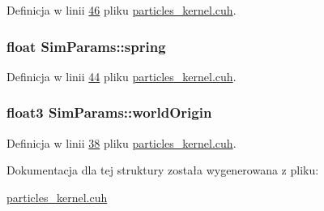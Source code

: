 Definicja w linii \hyperlink{particles__kernel_8cuh_source_l00046}{46} pliku \hyperlink{particles__kernel_8cuh_source}{particles\-\_\-kernel.\-cuh}.

\hypertarget{struct_sim_params_a301314921adc7bce20d8955cf03cdf3f}{
\subsubsection[{spring}]{\setlength{\rightskip}{0pt plus 5cm}float Sim\-Params\-::spring}}\label{struct_sim_params_a301314921adc7bce20d8955cf03cdf3f}


Definicja w linii \hyperlink{particles__kernel_8cuh_source_l00044}{44} pliku \hyperlink{particles__kernel_8cuh_source}{particles\-\_\-kernel.\-cuh}.

\hypertarget{struct_sim_params_a1ed7465773f15f2874650f19cec3d0a9}{
\subsubsection[{world\-Origin}]{\setlength{\rightskip}{0pt plus 5cm}float3 Sim\-Params\-::world\-Origin}}\label{struct_sim_params_a1ed7465773f15f2874650f19cec3d0a9}


Definicja w linii \hyperlink{particles__kernel_8cuh_source_l00038}{38} pliku \hyperlink{particles__kernel_8cuh_source}{particles\-\_\-kernel.\-cuh}.



Dokumentacja dla tej struktury została wygenerowana z pliku\-:\begin{DoxyCompactItemize}
\item 
\hyperlink{particles__kernel_8cuh}{particles\-\_\-kernel.\-cuh}\end{DoxyCompactItemize}

